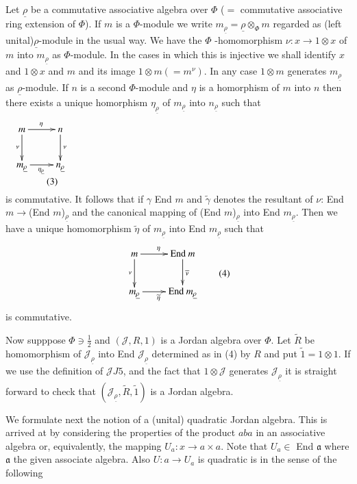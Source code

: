 Let $\underline{\rho}$ be a commutative associative algebra over
$\Phi$ ($=$ commutative associative ring extension of $\Phi$). If $m$
is a $\Phi$-module we write
$m_{\underline{\rho}}=\underline{\rho}\otimes_{\Phi} m$ regarded as
(left unital)$\underline{\rho}$-module in the usual way. We have the
$\Phi$ -homomorphism $\nu : x\to 1 \otimes x$ of $m$ into
$m_{\underline{\rho}}$ as $\Phi$-module. In the cases in which this is
injective we shall identify $x$ and $1\otimes x$ and $m$ and its image
$1\otimes m(=m^{\nu})$. In any case $1\otimes m$ generates
$m_{\underline{\rho}}$ as $\underline{\rho}$-module. If $n$ is a
second $\Phi$-module and $\eta$ is a homorphism of $m$ into $n$ then
there exists a unique homorphism $\eta_{\underline{\rho}}$ of
$m_{\underline{\rho}}$ into $n_{\underline{\rho}}$ such that 
\begin{equation*}
\vcenter{
  \xymatrix{
    m\ar[d]_{\nu}\ar[r]^{\eta}& n\ar[d]^{\nu}\\
    m_{\underline{\rho}}\ar[r]_{\eta_{\underline{\rho}}}& n_{\underline{\rho}}
  }\tag{3}\label{c1:eq3}}
\end{equation*}
is commutative. It follows that if  $\gamma$ End $m$ and
$\tilde{\gamma}$ denotes the 
resultant of $\nu$: End $m\to$(End $m$)$_{\underline{\rho}}$ and the
canonical mapping of (End $m$)$_{\underline{\rho}}$ into End
$m_{\underline{\rho}}$. Then we have a unique homomorphism
$\widetilde{\eta}$ of $m_{\underline{\rho}}$ into End
$m_{\underline{\rho}}$ such that 
\[
\vcenter{
\xymatrix{
m\ar[d]_{\nu}\ar[r]^{\eta}& \text{End}~ m\ar[d]^{\widetilde{\nu}}\\
m_{\underline{\rho}}\ar[r]_{\widetilde{\eta}}& \text{End}~ m_{\underline{\rho}}
}}\tag{4}\label{c1:eq4}
\]\pageoriginale
is commutative.

Now supppose $\Phi\ni\frac{1}{2}$ and $(\mathscr{J},R,1)$ is a Jordan
algebra over $\Phi$. Let $\widetilde{R}$ be homomorphism of
$\mathscr{J}_{\underline{\rho}}$ into End
$\mathscr{J}_{\underline{\rho}}$ determined as in (4) by $R$ and put
$\widetilde{1}=1\otimes1$. If we use the definition of $\mathscr{J}
J5$, and the fact that $1\otimes\mathscr{J}$ generates
$\mathscr{J}_{\underline{\rho}}$ it is straight forward to check that
$(\mathscr{J}_{\underline{\rho}},\widetilde{R}, \widetilde{1})$ is a
Jordan algebra. 

We formulate next the notion of a (unital) quadratic Jordan
algebra. This is arrived at by considering the properties of the
product $aba$ in an associative algebra or, equivalently, the mapping
$U_a:x\to a\times a$. Note that $U_a\in$ End $\mathfrak{a}$ where
$\mathfrak{a}$ the given associate algebra. Also $U: a\to U_a$ is
quadratic is in the sense of the following  

